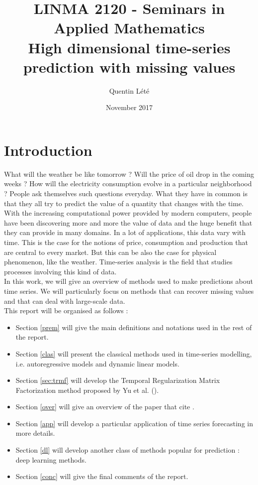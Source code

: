 \documentclass{article}
\title{LINMA 2120 - Seminars in Applied Mathematics \\
        High dimensional time-series prediction with missing values}
\author{Quentin Lété}
\date{November 2017}
\begin{document}
\maketitle

\section{Introduction}
What will the weather be like tomorrow ?
Will the price of oil drop in the coming weeks ?
How will the electricity consumption evolve in a particular neighborhood ?
People ask themselves such questions everyday.
What they have in common is that they all try to predict the value of a quantity that changes with the time.
With the increasing computational power provided by modern computers, people have been discovering more and more the value of data and the huge benefit that they can provide in many domains.
In a lot of applications, this data vary with time.
This is the case for the notions of price, consumption and production that are central to every market.
But this can be also the case for physical phenomenon, like the weather.
Time-series analysis is the field that studies processes involving this kind of data. \\
In this work, we will give an overview of methods used to make predictions about time series.
We will particularly focus on methods that can recover missing values and that can deal with large-scale data.\\

This report will be organised as follows :
\begin{itemize}
\item Section \ref{prem} will give the main definitions and notations used in the rest of the report.
\item Section \ref{clas} will present the classical methods used in time-series modelling, i.e. autoregressive models and dynamic linear models.
\item Section \ref{sec:trmf} will develop the Temporal Regularization Matrix Factorization method proposed by Yu et al. (\cite{TRMF}).
\item Section \ref{over} will give an overview of the paper that cite \cite{TRMF}.
\item Section \ref{app} will develop a particular application of time series forecasting in more details.
\item Section \ref{dl} will develop another class of methods popular for prediction : deep learning methods.
\item Section \ref{conc} will give the final comments of the report.
\end{itemize}
\end{document}
